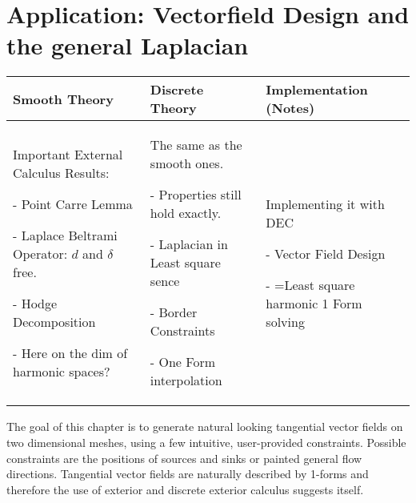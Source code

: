 \chapter{Application: Vectorfield Design and the general Laplacian}
	\begin{longtable}{|p{4.5cm}|p{4.5cm}|p{4.5cm}|}
		\hline
		Smooth Theory& Discrete Theory& Implementation (Notes)\\
		\hline
			Important External Calculus Results:
			\begin{packed_enum}
				\item[-] Point Carre Lemma
				\item[-] Laplace Beltrami Operator: $d$ and $\delta$ free.
				\item[-] Hodge Decomposition
				\item[-] Here on the dim of harmonic spaces?
			\end{packed_enum}
			&
			The same as the smooth ones.
			\begin{packed_enum}
				\item[-] Properties still hold exactly.
				\item[-] Laplacian in Least square sence
				\item[-] Border Constraints
				\item[-] One Form interpolation
			\end{packed_enum}
			 & 
			 Implementing it with DEC
			 \begin{packed_enum}
				\item[-] Vector Field Design
				\item[-] =Least square harmonic 1 Form solving
			\end{packed_enum}
			 \\		
		\hline
	\end{longtable}
	
The goal of this chapter is to generate natural looking tangential vector fields on two dimensional meshes, using a few intuitive, user-provided constraints. Possible constraints are the positions of sources and sinks or painted general flow directions. Tangential vector fields are naturally described by 1-forms and therefore the use of exterior and discrete exterior calculus suggests itself. 

